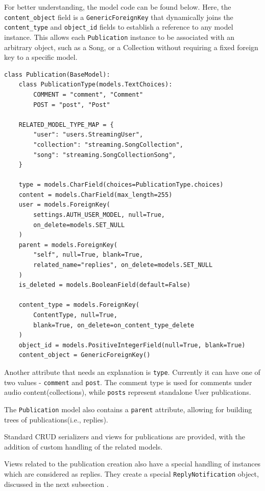 For better understanding, the model code can be found below.
Here, the \texttt{content\_object} field is a \texttt{GenericForeignKey}
that dynamically joins the \texttt{content\_type} and \texttt{object\_id}
fields to establish a reference to any model instance.
This allows each \texttt{Publication} instance to be associated with
an arbitrary object, such as a Song, or a Collection without requiring a
fixed foreign key to a specific model.

\begin{verbatim}
class Publication(BaseModel):
    class PublicationType(models.TextChoices):
        COMMENT = "comment", "Comment"
        POST = "post", "Post"

    RELATED_MODEL_TYPE_MAP = {
        "user": "users.StreamingUser",
        "collection": "streaming.SongCollection",
        "song": "streaming.SongCollectionSong",
    }

    type = models.CharField(choices=PublicationType.choices)
    content = models.CharField(max_length=255)
    user = models.ForeignKey(
        settings.AUTH_USER_MODEL, null=True,
        on_delete=models.SET_NULL
    )
    parent = models.ForeignKey(
        "self", null=True, blank=True,
        related_name="replies", on_delete=models.SET_NULL
    )
    is_deleted = models.BooleanField(default=False)

    content_type = models.ForeignKey(
        ContentType, null=True,
        blank=True, on_delete=on_content_type_delete
    )
    object_id = models.PositiveIntegerField(null=True, blank=True)
    content_object = GenericForeignKey()
\end{verbatim}

Another attribute that needs an explanation is \texttt{type}.
Currently it can have one of two values - \texttt{comment} and \texttt{post}.
The comment type is used for comments under audio content(collections),
while \texttt{posts} represent standalone User publications.

The \texttt{Publication} model also contains a \texttt{parent} attribute, allowing for
building trees of publications(i.e., replies).

Standard CRUD serializers and views for publications are provided,
with the addition of custom handling of the related models.

Views related to the publication creation also have a special handling
of instances which are considered as replies. They create a special
\texttt{ReplyNotification} object, discussed in the next subsection .

